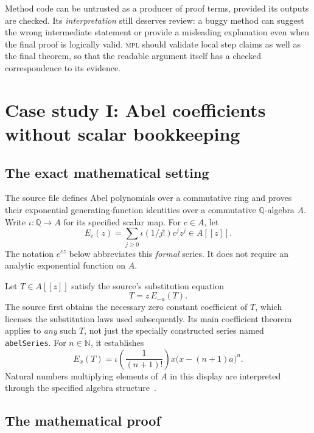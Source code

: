 \documentclass[11pt,a4paper]{article}
\newcommand{\MPL}{\textnormal{\textsc{mpl}}}
\newcommand{\N}{\mathbb N}
\newcommand{\Q}{\mathbb Q}
\newcommand{\code}[1]{\texttt{#1}}
\theoremstyle{remark}
\begin{document}
Method code can be untrusted as a producer of proof terms, provided its outputs are checked. Its \emph{interpretation} still deserves review: a buggy method can suggest the wrong intermediate statement or provide a misleading explanation even when the final proof is logically valid. \MPL{} should validate local step claims as well as the final theorem, so that the readable argument itself has a checked correspondence to its evidence.

\section{Case study I: Abel coefficients without scalar bookkeeping}
\label{sec:abel}

\subsection{The exact mathematical setting}

The source file defines Abel polynomials over a commutative ring and proves their exponential generating-function identities over a commutative $\Q$-algebra $A$. Write $\iota:\Q\to A$ for its specified scalar map. For $c\in A$, let
\[
E_c(z)=\sum_{j\ge0}\iota(1/j!)c^jz^j\in A[[z]].
\]
The notation $e^{cz}$ below abbreviates this \emph{formal} series. It does not require an analytic exponential function on $A$.

Let $T\in A[[z]]$ satisfy the source's substitution equation
\begin{equation}
T=z\,E_{-a}(T).
\label{eq:abel-def}
\end{equation}
The source first obtains the necessary zero constant coefficient of $T$, which licenses the substitution laws used subsequently. Its main coefficient theorem applies to \emph{any} such $T$, not just the specially constructed series named \code{abelSeries}. For $n\in\N$, it establishes
\begin{equation}
[z^{n+1}]E_x(T)
=\iota\!\left(\frac1{(n+1)!}\right)x\bigl(x-(n+1)a\bigr)^n.
\label{eq:abel-target}
\end{equation}
Natural numbers multiplying elements of $A$ in this display are interpreted through the specified algebra structure~\cite{proveit-abel}.

\subsection{The mathematical proof}
\end{document}
